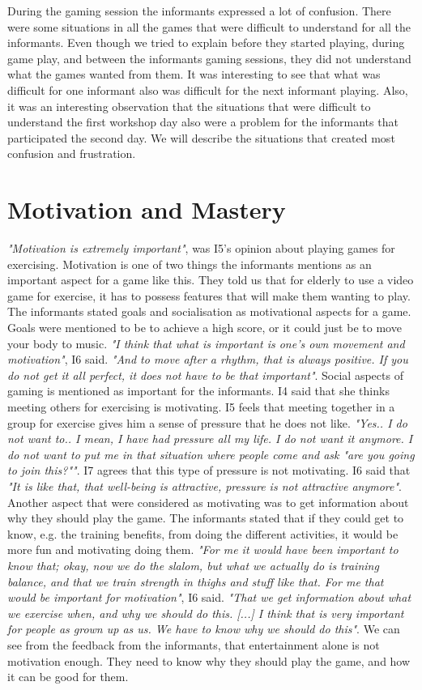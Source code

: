 During the gaming session the informants expressed a lot of confusion. There were some situations in all the games that were difficult to understand for all the informants. Even though we tried to explain before they started playing, during game play, and between the informants gaming sessions, they did not understand what the games wanted from them. It was interesting to see that what was difficult for one informant also was difficult for the next informant playing. Also, it was an interesting observation that the situations that were difficult to understand the first workshop day also were a problem for the informants that participated the second day. We will describe the situations that created most confusion and frustration.   

\section{Motivation and Mastery}

\emph{"Motivation is extremely important"}, was I5's opinion about playing games for exercising. Motivation is one of two things the informants mentions as an important aspect for a game like this. They told us that for elderly to use a video game for exercise, it has to possess features that will make them wanting to play. The informants stated goals and socialisation as motivational aspects for a game. Goals were mentioned to be to achieve a high score, or it could just be to move your body to music. \emph{"I think that what is important is one’s own movement and motivation"}, I6 said. \emph{"And to move after a rhythm, that is always positive. If you do not get it all perfect, it does not have to be that important"}. Social aspects of gaming is mentioned as important for the informants. I4 said that she thinks meeting others for exercising is motivating. I5 feels that meeting together in a group for exercise gives him a sense of pressure that he does not like. \emph{"Yes.. I do not want to.. I mean, I have had pressure all my life. I do not want it anymore. I do not want to put me in that situation where people come and ask "are you going to join this?""}. I7 agrees that this type of pressure is not motivating. I6 said that \emph{"It is like that, that well-being is attractive, pressure is not attractive anymore"}.  Another aspect that were considered as motivating was to get information about why they should play the game. The informants stated that if they could get to know, e.g. the training benefits, from doing the different activities, it would be more fun and motivating doing them. \emph{"For me it would have been important to know that; okay, now we do the slalom, but what we actually do is training balance, and that we train strength in thighs and stuff like that. For me that would be important for motivation"}, I6 said. \emph{"That we get information about what we exercise when, and why we should do this. [...] I think that is very important for people as grown up as us. We have to know why we should do this"}. We can see from the feedback from the informants, that entertainment alone is not motivation enough. They need to know why they should play the game, and how it can be good for them. 

